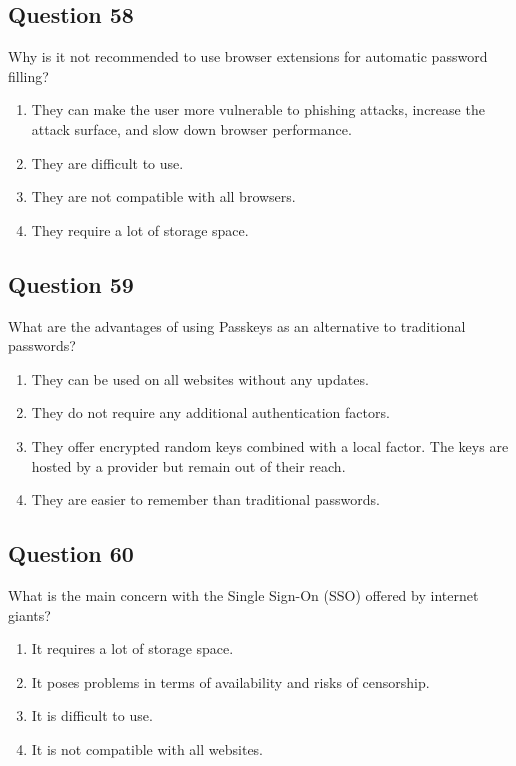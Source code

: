 \documentclass[12pt,a4paper]{article}
\begin{document}
\bigskip


\subsection*{Question 58}
Why is it not recommended to use browser extensions for automatic password filling?

\begin{enumerate}[label=\Alph*., leftmargin=*]
\item They can make the user more vulnerable to phishing attacks, increase the attack surface, and slow down browser performance.
\item They are difficult to use.
\item They are not compatible with all browsers.
\item They require a lot of storage space.
\end{enumerate}

\bigskip


\subsection*{Question 59}
What are the advantages of using Passkeys as an alternative to traditional passwords?

\begin{enumerate}[label=\Alph*., leftmargin=*]
\item They can be used on all websites without any updates.
\item They do not require any additional authentication factors.
\item They offer encrypted random keys combined with a local factor. The keys are hosted by a provider but remain out of their reach.
\item They are easier to remember than traditional passwords.
\end{enumerate}

\bigskip


\subsection*{Question 60}
What is the main concern with the Single Sign-On (SSO) offered by internet giants?

\begin{enumerate}[label=\Alph*., leftmargin=*]
\item It requires a lot of storage space.
\item It poses problems in terms of availability and risks of censorship.
\item It is difficult to use.
\item It is not compatible with all websites.
\end{enumerate}
\end{document}

